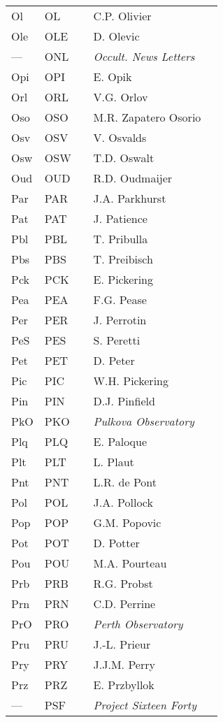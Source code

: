 \begin{longtable}{l|l|c|p{59mm}|l}
Ol  & OL  &   & C.P. Olivier & \\
Ole & OLE &   & D. Olevic & \\
--- & ONL &   & \emph{Occult. News Letters} & \\
Opi & OPI &   & E. Opik & \\
Orl & ORL &   & V.G. Orlov & \\
Oso & OSO &   & M.R. Zapatero Osorio & \\
Osv & OSV &   & V. Osvalds & \\
Osw & OSW &   & T.D. Oswalt & \\
Oud & OUD &   & R.D. Oudmaijer & \\\midrule
Par & PAR &   & J.A. Parkhurst & \\
Pat & PAT &   & J. Patience & \\
Pbl & PBL &   & T. Pribulla & \\
Pbs & PBS &   & T. Preibisch & \\
Pck & PCK &   & E. Pickering & \\
Pea & PEA &   & F.G. Pease & \\
Per & PER &   & J. Perrotin & \\
PeS & PES &   & S. Peretti & \\
Pet & PET &   & D. Peter & \\
Pic & PIC &   & W.H. Pickering & \\
Pin & PIN &   & D.J. Pinfield & \\
PkO & PKO &   & \emph{Pulkova Observatory} & \\
Plq & PLQ &   & E. Paloque & \\
Plt & PLT &   & L. Plaut & \\
Pnt & PNT &   & L.R. de Pont & \\
Pol & POL &   & J.A. Pollock & \\
Pop & POP &   & G.M. Popovic & \\
Pot & POT &   & D. Potter & \\
Pou & POU &   & M.A. Pourteau & \\
Prb & PRB &   & R.G. Probst & \\
Prn & PRN &   & C.D. Perrine & \\
PrO & PRO &   & \emph{Perth Observatory} & \\
Pru & PRU &   & J.-L. Prieur & \\
Pry & PRY &   & J.J.M. Perry & \\
Prz & PRZ &   & E. Przbyllok & \\
--- & PSF &   & \emph{Project Sixteen Forty} & \\

\end{longtable}

